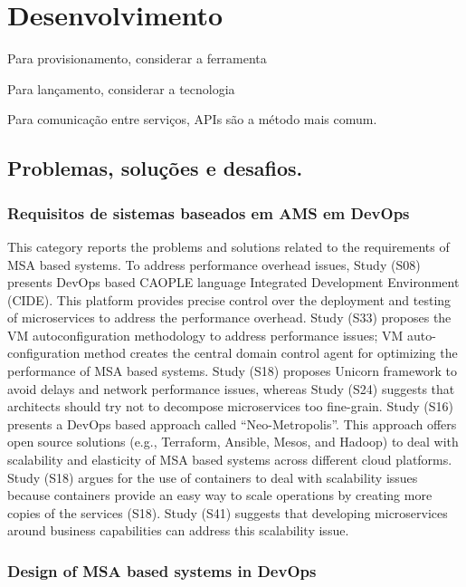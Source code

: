 \chapter{Desenvolvimento}

Para provisionamento, considerar a ferramenta ~~

Para lançamento, considerar a tecnologia ~~

Para comunicação entre serviços, APIs são a método mais comum.

\section{Problemas, soluções e desafios.}

\subsection*{Requisitos de sistemas baseados em AMS em DevOps}

This category reports the problems and solutions related to the requirements of MSA based systems. To address performance overhead issues, Study (S08) presents DevOps based CAOPLE language Integrated Development Environment (CIDE). This platform provides precise control over the deployment and testing of microservices to address the performance overhead. Study (S33) proposes the VM autoconfiguration methodology to address performance issues; VM auto-configuration method creates the central domain control agent for optimizing the performance of MSA based systems. Study (S18) proposes Unicorn framework to avoid delays and network performance issues, whereas Study (S24) suggests that architects should try not to decompose microservices too fine-grain. Study (S16) presents a DevOps based approach called “Neo-Metropolis”. This approach offers open source solutions (e.g., Terraform, Ansible, Mesos, and Hadoop) to deal with scalability and elasticity of MSA based systems across different cloud platforms. Study (S18) argues for the use of containers to deal with scalability issues because containers provide an easy way to scale operations by creating more copies of the services (S18). Study (S41) suggests that developing microservices around business capabilities can address this scalability issue.

\subsection{Design of MSA based systems in DevOps}

